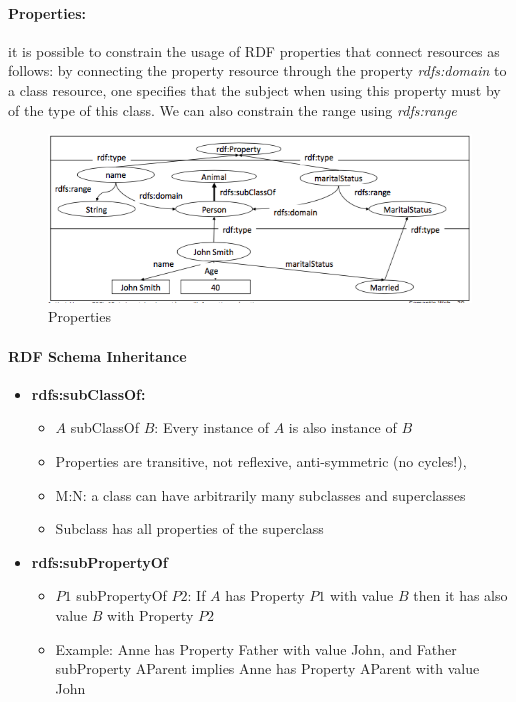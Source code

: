 \paragraph{Properties:} it is possible to constrain the usage of RDF properties that connect resources as follows: by connecting the property resource through the property \textit{rdfs:domain} to a class resource, one specifies that the subject when using this property must by of the type of this class. We can also constrain the range using \textit{rdfs:range}

\begin{figure}[H]
\begin{center}
\includegraphics[width=1\linewidth]{figures/properties.png}
\end{center}
\caption{Properties}
\label{fig:class}
\end{figure}

\paragraph{RDF Schema Inheritance}
\begin{itemize}
	\item \bf{rdfs:subClassOf:}
		\begin{itemize}
			\item $A$ subClassOf $B$: Every instance of $A$ is also instance of $B$
			\item Properties are transitive, not reflexive, anti-symmetric (no cycles!),
			\item M:N: a class can have arbitrarily many subclasses and superclasses
			\item Subclass has all properties of the superclass
		\end{itemize}
	\item \bf{rdfs:subPropertyOf}
		\begin{itemize}
			\item $P1$ subPropertyOf $P2$: If $A$ has Property $P1$ with value $B$ then it has also value $B$ with Property $P2$
			\item Example: Anne has Property Father with value John, and Father subProperty AParent implies Anne has Property AParent with value John
		\end{itemize}
\end{itemize}

